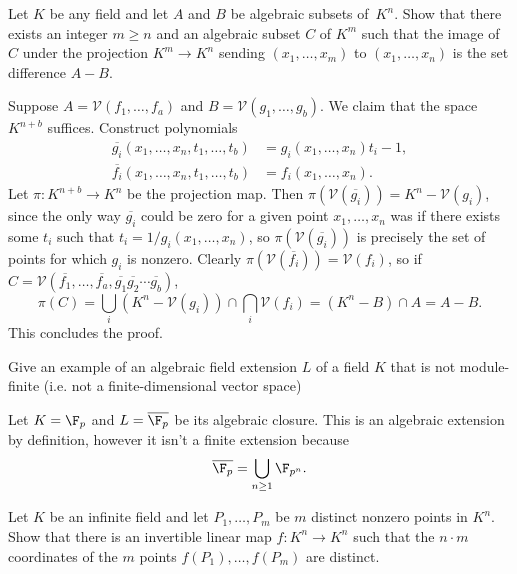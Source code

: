 \documentclass[11pt,letterpaper]{article}
\begin{document}
\begin{problem}
    Let $K$ be any field and let $A$ and $B$ be algebraic subsets of~$K^n$. Show that there exists an integer $m\geq n$ and an algebraic subset $C$ of $K^m$ such that the image of $C$ under the projection $K^m\rightarrow K^n$ sending $(x_1,\dots,x_m)$ to $(x_1,\dots,x_n)$ is the set difference $A - B$.
\end{problem}

\begin{solution}
    Suppose $A=\mathcal{V}(f_1,\ldots,f_a)$ and $B=\mathcal{V}(g_1,\ldots,g_b)$. We claim that the space $K^{n+b}$ suffices. Construct polynomials
    \[
        \begin{aligned}
            \overline{g_i}(x_1,\ldots, x_n, t_1,\ldots,t_b) &= g_i(x_1,\ldots,x_n)t_i-1,\\
            \overline{f_i}(x_1,\ldots, x_n, t_1,\ldots,t_b) &= f_i(x_1,\ldots,x_n).
        \end{aligned}
    \]  
    Let $\pi : K^{n+b} \to K^n$ be the projection map. Then $\pi(\mathcal{V}(\overline{g_i}))=K^n-\mathcal{V}(g_i)$, since the only way $\overline{g_i}$ could be zero for a given point $x_1,\ldots,x_n$ was if there exists some $t_i$ such that $t_i=1 / g_i(x_1,\ldots,x_n)$, so $\pi(\mathcal{V}(\overline{g_i}))$ is precisely the set of points for which $g_i$ is nonzero. Clearly $\pi(\mathcal{V}(\overline{f_i}))=\mathcal{V}(f_i)$, so if $C=\mathcal{V}(\overline{f_1},\ldots,\overline{f_a},\overline{g_1}\overline{g_2}\cdots \overline{g_b})$, $$\pi(C)=\bigcup_i(K^n-\mathcal{V}(g_i))\cap \bigcap_i\mathcal{V}(f_i)=(K^n-B)\cap A= A-B.$$  
    This concludes the proof.
    
\end{solution}

\begin{problem}
    Give an example of an algebraic field extension $L$ of a field $K$ that is not module-finite (i.e.{} not a finite-dimensional vector space)
\end{problem}

\begin{solution}
    Let $K=\F_p$ and $L=\overline{\F_p}$ be its algebraic closure. This is an algebraic extension by definition, however it isn't a finite extension because
    \[
        \overline{\F_p}=\bigcup_{n\geq 1} \F_{p^n}
    .\]  
\end{solution}

\begin{problem}
    Let $K$ be an infinite field and let $P_1,\dots,P_m$ be $m$ distinct nonzero points in $K^n$. Show that there is an invertible linear map $f:K^n\rightarrow K^n$ such that the $n\cdot m$ coordinates of the $m$ points $f(P_1),\dots,f(P_m)$ are distinct.
\end{problem}
\end{document}
